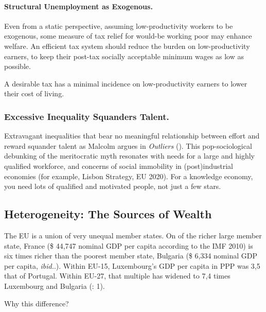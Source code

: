 \paragraph{Structural Unemployment as Exogenous.} 
Even from a static perspective, assuming low-productivity workers to be exogenous, some measure of tax relief for would-be working poor may enhance welfare. An efficient tax system should reduce the burden on low-productivity earners, to keep their post-tax socially acceptable minimum wages as low as possible. 
\newpage
\begin{desideratum}
	A desirable tax has a minimal incidence on low-productivity earners to lower their cost of living.
	\label{des:low-price-floor}
\end{desideratum}

\subsubsection{Excessive Inequality Squanders Talent.} 
Extravagant inequalities that bear no meaningful relationship between effort and reward squander talent as Malcolm \citeauthor{Gladwell} argues in \emph{Outliers} (\citeyear{Gladwell}). This pop-sociological debunking of the meritocratic myth resonates with needs 
for a large and highly qualified workforce, and concerns of social immobility in (post)industrial economies (for example, Lisbon Strategy, EU 2020). For a knowledge economy, you need lots of qualified and motivated people, not just a few stars.

\subsection[Heterogeneity]{Heterogeneity: The Sources of Wealth} \label{sec:sources-of-wealth} The \gls{EU} is a union of very unequal member states. On of the richer large member state, France (\$ 44,747 nominal \gls{GDP} per capita according to the IMF 2010) is six times richer than the poorest member state, Bulgaria (\$ 6,334 nominal \gls{GDP} per capita, \emph{ibid.}.). Within \gls{EU}-15, Luxembourg's \gls{GDP} per capita in \gls{PPP} was 3,5 that of Portugal. Within \gls{EU}-27, that multiple has widened to 7,4 times Luxembourg and Bulgaria (\citealt{Alber2008}: 1). %


Why this difference?

